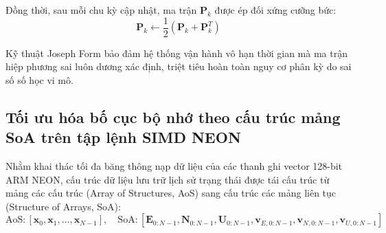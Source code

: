 Đồng thời, sau mỗi chu kỳ cập nhật, ma trận $\mathbf{P}_k$ được ép đối xứng cưỡng bức:
\begin{equation}
\mathbf{P}_k \leftarrow \frac{1}{2} \left( \mathbf{P}_k + \mathbf{P}_k^T \right)
\label{eq:forced-symmetry-projection}
\end{equation}

\begin{table}[H]
\centering
\caption{Độ ổn định số học và điều kiện ma trận sau 1.000.000 chu kỳ tính toán liên tục}
\label{tab:numerical-stability-joseph-comparison}
\end{table}

Kỹ thuật Joseph Form bảo đảm hệ thống vận hành vô hạn thời gian mà ma trận hiệp phương sai luôn dương xác định, triệt tiêu hoàn toàn nguy cơ phân kỳ do sai số số học vi mô.

\subsection{Tối ưu hóa bố cục bộ nhớ theo cấu trúc mảng SoA trên tập lệnh SIMD NEON}

\hspace{0.5cm} Nhằm khai thác tối đa băng thông nạp dữ liệu của các thanh ghi vector 128-bit ARM NEON, cấu trúc dữ liệu lưu trữ lịch sử trạng thái được tái cấu trúc từ mảng các cấu trúc (Array of Structures, AoS) sang cấu trúc các mảng liên tục (Structure of Arrays, SoA):
\begin{equation}
\text{AoS}: [\mathbf{x}_0, \mathbf{x}_1, \dots, \mathbf{x}_{N-1}], \quad \text{SoA}: [\mathbf{E}_{0:N-1}, \mathbf{N}_{0:N-1}, \mathbf{U}_{0:N-1}, \mathbf{v}_{E, 0:N-1}, \mathbf{v}_{N, 0:N-1}, \mathbf{v}_{U, 0:N-1}]
\label{eq:soa-vs-aos-memory-layout}
\end{equation}

